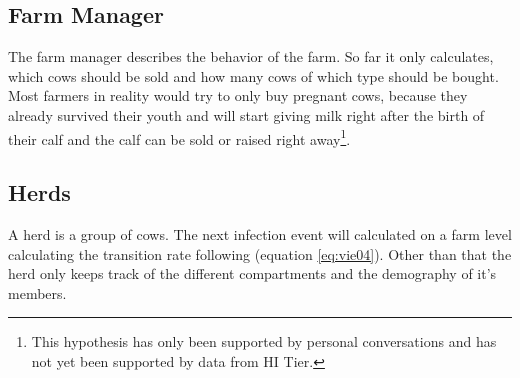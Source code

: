 \subsection{Farm Manager}\label{chap:farmManager}
The farm manager describes the behavior of the farm. So far it only calculates, which cows should be sold and how many cows of which type should be bought. Most farmers in reality would try to only buy pregnant cows, because they already survived their youth and will start giving milk right after the birth of their calf and the calf can be sold or raised right away\footnote{This hypothesis has only been supported by personal conversations and has not yet been supported by data from HI Tier.}.
\subsection{Herds}
A herd is a group of cows. The next infection event will calculated on a farm level calculating the transition rate following \citep{VIE04} (equation \ref{eq:vie04}). Other than that the herd only keeps track of the different compartments and the demography of it's members.
